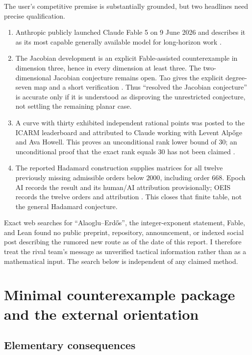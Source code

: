 \documentclass[11pt,oneside]{article}
\theoremstyle{definition}
\begin{document}
The user's competitive premise is substantially grounded, but two headlines need precise
qualification.

\begin{enumerate}
\item Anthropic publicly launched Claude Fable 5 on 9 June 2026 and describes it as its most
  capable generally available model for long-horizon work \cite{AnthropicFable}.
\item The Jacobian development is an explicit Fable-assisted counterexample in dimension
  three, hence in every dimension at least three.  The two-dimensional Jacobian conjecture
  remains open.  Tao gives the explicit degree-seven map and a short verification
  \cite{TaoJacobian}.  Thus ``resolved the Jacobian conjecture'' is accurate only if it is
  understood as disproving the unrestricted conjecture, not settling the remaining planar
  case.
\item A curve with thirty exhibited independent rational points was posted to the ICARM
  leaderboard and attributed to Claude working with Levent Alp\H{o}ge and Ava Howell.  This
  proves an unconditional rank lower bound of $30$; an unconditional proof that the exact
  rank equals $30$ has not been claimed \cite{ICARM30,MathWorldRank30}.
\item The reported Hadamard construction supplies matrices for all twelve previously missing
  admissible orders below $2000$, including order $668$.  Epoch AI records the result and its
  human/AI attribution provisionally; OEIS records the twelve orders and attribution
  \cite{EpochHadamard,OEISHadamard}.  This closes that finite table, not the general Hadamard
  conjecture.
\end{enumerate}

Exact web searches for ``Alaoglu--Erd\H{o}s'', the integer-exponent statement, Fable, and Lean
found no public preprint, repository, announcement, or indexed social post describing the
rumored new route as of the date of this report.  I therefore treat the rival team's message
as unverified tactical information rather than as a mathematical input.  The search below is
independent of any claimed method.

\section{Minimal counterexample package and the external orientation}
\label{sec:minimal-package}

\subsection{Elementary consequences}
\end{document}
